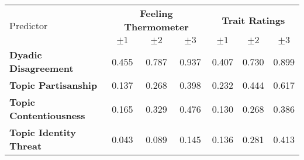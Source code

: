\begin{tabular}{lccc ccc}
\hline
\multirow{2}{*}{Predictor} & \multicolumn{3}{c}{\textbf{Feeling Thermometer}} & \multicolumn{3}{c}{\textbf{Trait Ratings}} \\
 & $\pm1$ & $\pm2$ & $\pm3$ & $\pm1$ & $\pm2$ & $\pm3$ \\
\hline
\textbf{Dyadic Disagreement} & 0.455 & 0.787 & 0.937 & 0.407 & 0.730 & 0.899 \\
\textbf{Topic Partisanship} & 0.137 & 0.268 & 0.398 & 0.232 & 0.444 & 0.617 \\
\textbf{Topic Contentiousness} & 0.165 & 0.329 & 0.476 & 0.130 & 0.268 & 0.386 \\
\textbf{Topic Identity Threat} & 0.043 & 0.089 & 0.145 & 0.136 & 0.281 & 0.413 \\
\hline
\end{tabular}